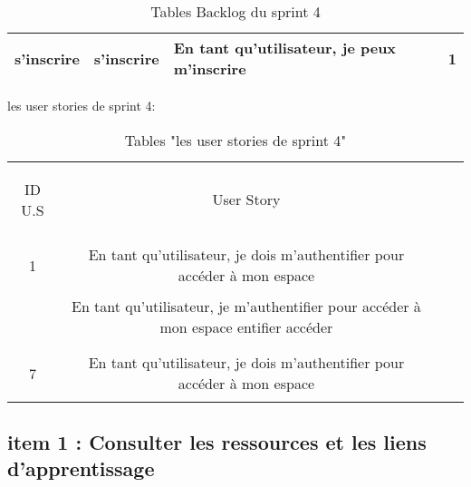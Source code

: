 \begin{table}[]
\begin{tabular}{|l|l|l|l|}
		\textbf{s'inscrire}                    & s'inscrire                                                            & En tant qu'utilisateur, je peux m'inscrire                                                                        & 1    \\ \hline
	\end{tabular}
	
	
	\caption{Tables Backlog du sprint 4}
	\label{Tables Backlog du sprint 4}
\end{table}










\begin{table}[h]
	{\Large \color{cyan} les user stories de sprint 4:}
	
	\begin{center}
		\begin{tabular}{>{\begin{bf} } c <{\end{bf}}ccc}
			
			\rowcolor{-blue!20!red}ID U.S & \begin{bf}User Story \end{bf}  & \\
			
			1 & En tant qu’utilisateur, je dois m’authentifier pour accéder à mon espace \\
			& En tant qu’utilisateur, je  m’authentifier pour accéder à mon espace entifier accéder
			\\
			& \\
			7 & En tant qu’utilisateur, je dois m’authentifier pour accéder à mon espace \\
			
			
		\end{tabular}
	\end{center}
	\caption{Tables  "les user stories de sprint 4"}
	\label{les user stories de sprint 4}
\end{table}



\clearpage
\clearpage
\subsection{item 1 : Consulter les ressources et les liens d'apprentissage}
